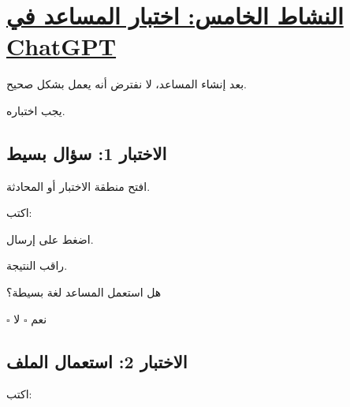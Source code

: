 \documentclass[a4paper]{article}
\begin{document}
\[
\boxed{\hspace{15cm}}
\]



\section*{\khatt\underline{النشاط الخامس: اختبار المساعد في ChatGPT}}

بعد إنشاء المساعد، لا نفترض أنه يعمل بشكل
صحيح.

يجب اختباره.

\subsection*{\khatt الاختبار 1: سؤال بسيط}

افتح منطقة الاختبار أو المحادثة.

اكتب:

\begin{center}


\end{center}

اضغط على إرسال.

راقب النتيجة.

هل استعمل المساعد لغة بسيطة؟

\begin{center}

$\square$ نعم
\qquad
$\square$ لا

\end{center}



\subsection*{\khatt الاختبار 2: استعمال الملف}

اكتب:

\begin{center}


\end{center}
\end{document}
